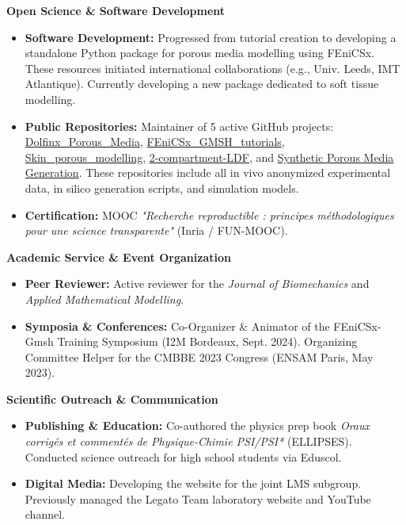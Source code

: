 \documentclass[10pt, a4paper]{article}
\begin{document}
\vspace{2pt}\noindent\textbf{Open Science \& Software Development}
\begin{itemize}
  \item \textbf{Software Development:} Progressed from tutorial creation to developing a standalone Python package for porous media modelling using FEniCSx. These resources initiated international collaborations (e.g., Univ. Leeds, IMT Atlantique). Currently developing a new package dedicated to soft tissue modelling.
  \item \textbf{Public Repositories:} Maintainer of 5 active GitHub projects: \href{https://github.com/Th0masLavigne/Dolfinx_Porous_Media}{Dolfinx\_Porous\_Media}, \href{https://github.com/Th0masLavigne/FEniCSx_GMSH_tutorials}{FEniCSx\_GMSH\_tutorials}, \href{https://github.com/Th0masLavigne/Skin_porous_modelling}{Skin\_porous\_modelling}, \href{https://github.com/Th0masLavigne/2-compartment-poromechanical-and-LDF-measurement}{2-compartment-LDF}, and \href{https://github.com/Th0masLavigne/Porous_media_Generation}{Synthetic Porous Media Generation}. These repositories include all in vivo anonymized experimental data, in silico generation scripts, and simulation models.
  \item \textbf{Certification:} MOOC \textit{"Recherche reproductible : principes méthodologiques pour une science transparente"} (Inria / FUN-MOOC).
\end{itemize}

\vspace{2pt}\noindent\textbf{Academic Service \& Event Organization}
\begin{itemize}
  \item \textbf{Peer Reviewer:} Active reviewer for the \textit{Journal of Biomechanics} and \textit{Applied Mathematical Modelling}.
  \item \textbf{Symposia \& Conferences:} Co-Organizer \& Animator of the FEniCSx-Gmsh Training Symposium (I2M Bordeaux, Sept. 2024). Organizing Committee Helper for the CMBBE 2023 Congress (ENSAM Paris, May 2023).
\end{itemize}

\vspace{2pt}\noindent\textbf{Scientific Outreach \& Communication}
\begin{itemize}
  \item \textbf{Publishing \& Education:} Co-authored the physics prep book \textit{Oraux corrigés et commentés de Physique-Chimie PSI/PSI*} (ELLIPSES). Conducted science outreach for high school students via Eduscol.
  \item \textbf{Digital Media:} Developing the website for the joint LMS subgroup. Previously managed the Legato Team laboratory website and YouTube channel.
\end{itemize}
\end{document}
